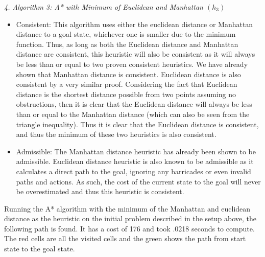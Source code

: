 \documentclass[a4paper]{article}
\begin{document}
\textit{4. Algorithm 3: A* with Minimum of Euclidean and Manhattan $(h_3)$}
\begin{itemize}
    \item Consistent: This algorithm uses either the euclidean distance or Manhattan distance to a goal state, whichever one is smaller due to the minimum function. Thus, as long as both the  Euclidean distance and Manhattan distance are consistent, this heuristic will also be consistent as it will always be less than or equal to two proven consistent heuristics.  We have already shown that Manhattan distance is consistent. Euclidean distance is also consistent by a very similar proof. Considering the fact that Euclidean distance is the shortest distance possible from two points assuming no obstructions, then it is clear that the Euclidean distance will always be less than or equal to the Manhattan distance (which can also be seen from the triangle inequality). Thus it is clear that the Euclidean distance is consistent, and thus the minimum of these two heuristics is also consistent.
    \item Admissible: The Manhattan distance heuristic has already been shown to be admissible. Euclidean distance heuristic is also known to be admissible as it calculates a direct path to the goal, ignoring any barricades or even invalid paths and actions. As such, the cost of the current state to the goal will never be overestimated and thus this heuristic is consistent.
\end{itemize}
Running the A* algorithm with the minimum of the Manhattan and euclidean distance as the heuristic on the initial problem described in the setup above, the following path is found. It has a cost of 176 and took .0218 seconds to compute. The red cells are all the visited cells and the green shows the path from start state to the goal state.
\end{document}
